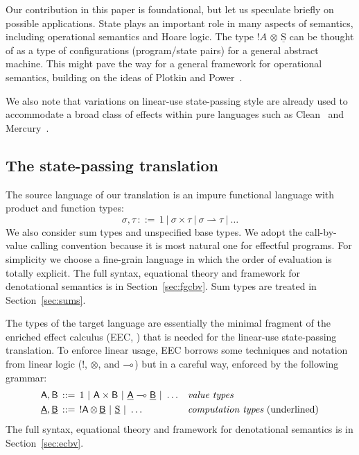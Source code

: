 \documentclass{LMCS}
\newcommand{\pto}{\rightharpoonup}
\newcommand{\comptype}[1]{\underline{#1}}
\newcommand{\VA}{\mathsf{A}}
\newcommand{\VB}{\mathsf{B}}
\newcommand{\CA}{\comptype{\mathsf{A}}}
\newcommand{\CB}{\comptype{\mathsf{B}}}
\newcommand{\tensor}{\otimes}
\newcommand{\ltensortype}[2]{{!} #1 \, {\tensor} \, #2}
\newcommand{\states}{{\underline{\mathrm{S}}}}
\begin{document}
Our contribution in this paper is foundational,
but let us speculate briefly on possible applications.
State plays an important role in many aspects of semantics,
including operational semantics and Hoare
logic.  
The type $\ltensortype A\states$ can be thought of as a type of 
configurations (program/state pairs) 
for a general abstract machine.
This might pave the way for a general framework for operational semantics, 
building 
on the ideas of Plotkin and Power~\cite{Plotkin:Power:08}.

We also note that variations on linear-use state-passing style
are already used to accommodate a broad class of effects 
within pure languages such as Clean~\cite{DBLP:journals/jfp/AchtenP95} and Mercury~\cite{DBLP:journals/jlp/SomogyiHC96}.

\subsection{The state-passing translation}
The source language of our translation is an impure functional
language with
product and function types:
\[
\sigma,\tau\, ::=\,
1~|~\sigma\times \tau~|~\sigma\pto \tau~|~\dots
\]
We also consider sum types and unspecified base types.
We adopt the 
call-by-value calling convention because it is 
most natural one for effectful programs.
For simplicity we choose a fine-grain language
in which the order of evaluation is totally explicit.
The full syntax, equational theory
and framework for denotational semantics is in Section~\ref{sec:fgcbv}.
Sum types are treated in Section~\ref{sec:sums}.

The types of the target language are essentially the minimal
fragment of the enriched effect calculus (EEC, \cite{Mogelberg:CSL:09,EEC:journal}) 
that is 
needed for the linear-use state-passing translation.
To enforce linear usage, EEC borrows some techniques and notation
from linear logic ($!$, $\tensor$, and $\multimap$)
but in a careful way, enforced by the following grammar:
\begin{align*}
\VA,\VB\,&::=\,1~|~\VA\times\VB~|~\CA\lpop \CB~|~\dots&&\textit{value types}
\\
\CA,\CB\,&::=\,\ltensortype \VA \CB~|~\states~|~\dots&&\textit{computation types}\text{ (underlined)}
\end{align*}
The full syntax, equational theory
and framework for denotational semantics is in 
Section~\ref{sec:ecbv}.
\end{document}
